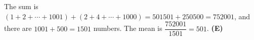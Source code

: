 The sum is $(1+2+\cdots+1001)+(2+4+\cdots+1000)=501501+250500=752001$, and there are $1001+500=1501$ numbers. The mean is $\dfrac{752001}{1501}=501$. \textbf{(E)}
